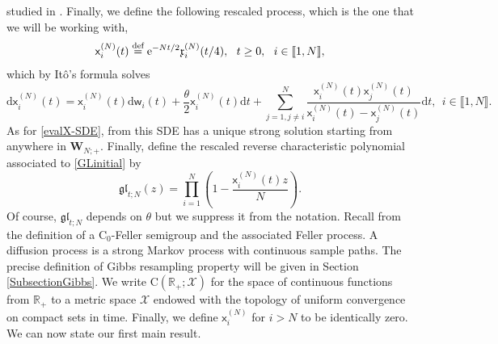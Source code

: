 \documentclass[]{article}
\begin{document}
studied in \cite{Heckman-Opdam}. Finally, we define the following rescaled process, which is the one that we will be working with,
\begin{align}\label{x-rsc}
    \mathsf{x}_i^{(N)}(t)
    \overset{\textnormal{def}}{=}
    \mathrm{e}^{-Nt/2}\mathfrak{x}_i^{(N)}(t/4), \  \ t\ge 0,\  \ i \in \llbracket 1, N \rrbracket,
\end{align}
which by It\^o's formula solves
\begin{equation}\label{GLinitial}
\mathrm{d}\mathsf{x}_i^{(N)}(t) = \mathsf{x}_i^{(N)}(t) \mathrm{d}\mathsf{w}_i(t) +\frac{\theta}{2}\mathsf{x}_i^{(N)}(t)\mathrm{d}t+\sum_{j=1,j\neq i}^N\frac{\mathsf{x}_i^{(N)}(t)\mathsf{x}^{(N)}_j(t)}{\mathsf{x}^{(N)}_i(t)-\mathsf{x}^{(N)}_j(t)}\mathrm{d}t, \ \  i\in \llbracket 1, N\rrbracket.   
\end{equation}
As for \eqref{evalX-SDE}, from \cite{AGZ,Graczyk-Malecki} this SDE has a unique strong solution starting from anywhere in $\mathbf{W}_{N;+}$. Finally, define the rescaled reverse characteristic polynomial associated to \eqref{GLinitial} by 
\begin{equation*}
\mathfrak{gl}_{t;N}(z)=\prod_{i=1}^N\left(1-\frac{\mathsf{x}_i^{(N)}(t)z}{N}\right).
\end{equation*}
Of course, $\mathfrak{gl}_{t;N}$ depends on $\theta$ but we suppress it from the notation. Recall from \cite{Kallenberg} the definition of a $\mathrm{C}_0$-Feller semigroup and the associated Feller process. A diffusion process is a strong Markov process with continuous sample paths. The precise definition of Gibbs resampling property \cite{CorwinHammond1} will be given in Section \ref{SubsectionGibbs}. We write $\mathrm{C}(\mathbb{R}_{+};\mathscr{X})$ for the space of continuous functions from $\mathbb{R}_+$ to a metric space $\mathscr{X}$ endowed with the topology of uniform convergence on compact sets in time. Finally, we define $\mathsf{x}_i^{(N)}$ for $i>N$ to be identically zero. We can now state our first main result. 
\end{document}
